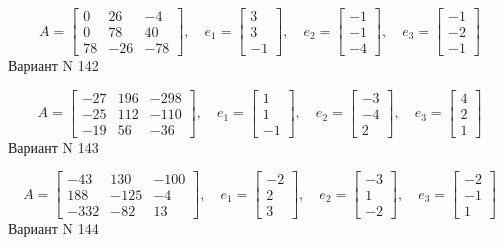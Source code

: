 \documentclass[11pt]{report}
\begin{document}
$$A = \left[\begin{matrix}0 & 26 & -4\\0 & 78 & 40\\78 & -26 & -78\end{matrix}\right],\quad e_1 = \left[\begin{matrix}3\\3\\-1\end{matrix}\right],\quad e_2 = \left[\begin{matrix}-1\\-1\\-4\end{matrix}\right],\quad e_3 = \left[\begin{matrix}-1\\-2\\-1\end{matrix}\right]$$Вариант N 142

$$A = \left[\begin{matrix}-27 & 196 & -298\\-25 & 112 & -110\\-19 & 56 & -36\end{matrix}\right],\quad e_1 = \left[\begin{matrix}1\\1\\-1\end{matrix}\right],\quad e_2 = \left[\begin{matrix}-3\\-4\\2\end{matrix}\right],\quad e_3 = \left[\begin{matrix}4\\2\\1\end{matrix}\right]$$Вариант N 143

$$A = \left[\begin{matrix}-43 & 130 & -100\\188 & -125 & -4\\-332 & -82 & 13\end{matrix}\right],\quad e_1 = \left[\begin{matrix}-2\\2\\3\end{matrix}\right],\quad e_2 = \left[\begin{matrix}-3\\1\\-2\end{matrix}\right],\quad e_3 = \left[\begin{matrix}-2\\-1\\1\end{matrix}\right]$$Вариант N 144
\end{document}
